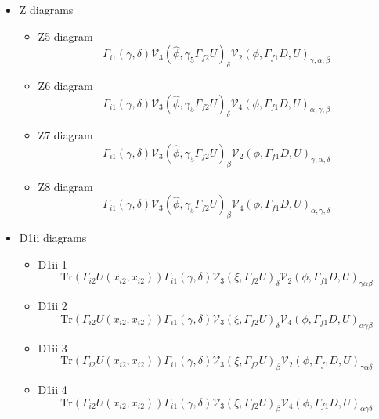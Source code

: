 \documentclass{article}[12pt]
\begin{document}
\begin{itemize}
\begin{itemize}
$$
\phi_U^{i2}(x_{f1})(\gamma_5\phi_D^{i2}\gamma_5\Gamma_{i2})^{\dagger}(x_{i1})\mathrm{Tr}(
\phi_U^{f2}(x_{f1})(\gamma_5\phi_D^{f2}\gamma_5\Gamma_{f2})^{\dagger}(x_{i1})
\Gamma_{i1}^tD(x_{f1},x_{i1})^t\Gamma_{f1}^t 
$$
$$
{\mathcal V}_5(i2,f2)_{\beta\delta}{\mathcal V}_6(i2,f2)_{\alpha\gamma}(phiui2,phiuf2D)
$$
\end{itemize}
\item Z diagrams
\begin{itemize}
\item Z5 diagram
$$
\Gamma_{i1}\left(\gamma,\delta\right){\mathcal V}_3\left(\hat{\phi},\gamma_5\Gamma_{f2}U\right)_{\delta}{\mathcal V}_2\left(\phi,\Gamma_{f1}D,U\right)_{\gamma,\alpha,\beta}
$$
\item Z6 diagram
$$
\Gamma_{i1}\left(\gamma,\delta\right){\mathcal V}_3\left(\hat{\phi},\gamma_5\Gamma_{f2}U\right)_{\delta}{\mathcal V}_4\left(\phi,\Gamma_{f1}D,U\right)_{\alpha,\gamma,\beta}
$$
\item Z7 diagram
$$
\Gamma_{i1}\left(\gamma,\delta\right){\mathcal V}_3\left(\hat{\phi},\gamma_5\Gamma_{f2}U\right)_{\beta}{\mathcal V}_2\left(\phi,\Gamma_{f1}D,U\right)_{\gamma,\alpha,\delta}
$$
\item Z8 diagram
$$
\Gamma_{i1}\left(\gamma,\delta\right){\mathcal V}_3\left(\hat{\phi},\gamma_5\Gamma_{f2}U\right)_{\beta}{\mathcal V}_4\left(\phi,\Gamma_{f1}D,U\right)_{\alpha,\gamma,\delta}
$$
\end{itemize}
\item D1ii diagrams
\begin{itemize}
\item D1ii 1
$$
\mathrm{Tr}\left(\Gamma_{i2}U\left(x_{i2},x_{i2}\right)\right)
\Gamma_{i1}\left(\gamma,\delta\right){\mathcal V}_{3}\left(\xi,\Gamma_{f2}U\right)_{\delta}{\mathcal V}_{2}\left(\phi,\Gamma_{f1}D,U\right)_{\gamma\alpha\beta}
$$
\item D1ii 2
$$
\mathrm{Tr}\left(\Gamma_{i2}U\left(x_{i2},x_{i2}\right)\right)
\Gamma_{i1}\left(\gamma,\delta\right){\mathcal V}_{3}\left(\xi,\Gamma_{f2}U\right)_{\delta}{\mathcal V}_{4}\left(\phi,\Gamma_{f1}D,U\right)_{\alpha\gamma\beta}
$$ 
\item D1ii 3
$$
\mathrm{Tr}\left(\Gamma_{i2}U\left(x_{i2},x_{i2}\right)\right)
\Gamma_{i1}\left(\gamma,\delta\right){\mathcal V}_{3}\left(\xi,\Gamma_{f2}U\right)_{\beta}{\mathcal V}_{2}\left(\phi,\Gamma_{f1}D,U\right)_{\gamma\alpha\delta}
$$
\item D1ii 4
$$
\mathrm{Tr}\left(\Gamma_{i2}U\left(x_{i2},x_{i2}\right)\right)
\Gamma_{i1}\left(\gamma,\delta\right){\mathcal V}_{3}\left(\xi,\Gamma_{f2}U\right)_{\beta}{\mathcal V}_{4}\left(\phi,\Gamma_{f1}D,U\right)_{\alpha\gamma\delta}
$$
\end{itemize}
\end{itemize}
\end{document}
